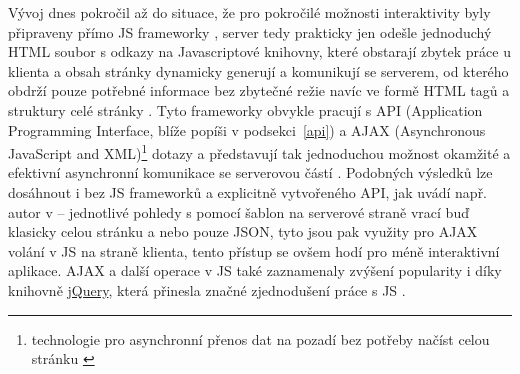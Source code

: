         Vývoj dnes pokročil až do situace, že pro pokročilé možnosti interaktivity byly připraveny přímo JS frameworky \cite{scripting-upwork}, server tedy prakticky jen odešle jednoduchý HTML soubor s odkazy na Javascriptové knihovny, které obstarají zbytek práce u klienta a obsah stránky dynamicky generují a komunikují se serverem, od kterého obdrží pouze potřebné informace bez zbytečné režie navíc ve formě HTML tagů a struktury celé stránky \cite{scripting-fasthosts}. Tyto frameworky obvykle pracují s API (Application Programming Interface, blíže popíši v podsekci~\ref{api}) a AJAX (Asynchronous JavaScript and XML)\footnote{technologie pro asynchronní přenos dat na pozadí bez potřeby načíst celou stránku \cite{scripting-fasthosts}} dotazy \cite{scripting-fasthosts} a představují tak jednoduchou možnost okamžité a efektivní asynchronní komunikace se serverovou částí \cite{scripting-upwork}. Podobných výsledků lze dosáhnout i bez JS frameworků a explicitně vytvořeného API, jak uvádí např. autor v \cite{scripting-simpleis} -- jednotlivé pohledy s pomocí šablon na serverové straně vrací buď klasicky celou stránku a nebo pouze JSON, tyto jsou pak využity pro AJAX volání v JS na straně klienta, tento přístup se ovšem hodí pro méně interaktivní aplikace. AJAX a další operace v JS také zaznamenaly zvýšení popularity i díky knihovně \href{http://jquery.com/}{jQuery}, která přinesla značné zjednodušení práce s JS \cite{scripting-upwork}.
        
